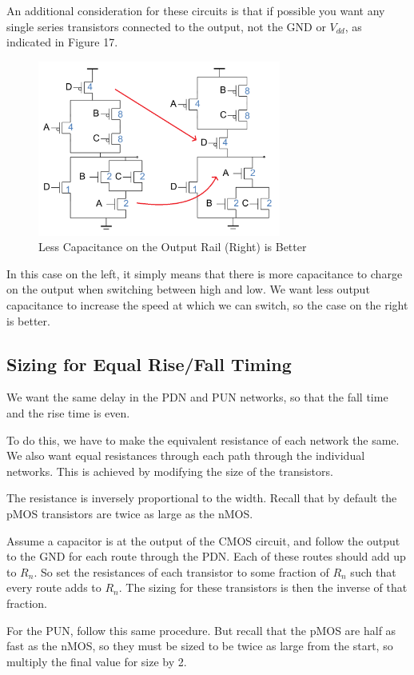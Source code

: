 \documentclass{article}
\begin{document}
An additional consideration for these circuits is that if possible you want any single series transistors connected to the output, not the GND or $V_{dd}$, as indicated in Figure 17.

\begin{figure}[ht!]
\centering
\includegraphics[width=80mm]{Capacitors.png}
\caption{Less Capacitance on the Output Rail (Right) is Better}
\end{figure}

In this case on the left, it simply means that there is more capacitance to charge on the output when switching between high and low. We want less output capacitance to increase the speed at which we can switch, so the case on the right is better. 


\subsection{Sizing for Equal Rise/Fall Timing}

We want the same delay in the PDN and PUN networks, so that the fall time and the rise time is even.

To do this, we have to make the equivalent resistance of each network the same.  We also want equal resistances through each path through the individual networks. This is achieved by modifying the size of the transistors.

The resistance is inversely proportional to the width.  Recall that by default the pMOS transistors are twice as large as the nMOS. 

Assume a capacitor is at the output of the CMOS circuit, and follow the output to the GND for each route through the PDN. Each of these routes should add up to $R_n$. So set the resistances of each transistor to some fraction of $R_n$ such that every route adds to $R_n$. The sizing for these transistors is then the inverse of that fraction. 

For the PUN, follow this same procedure. But recall that the pMOS are half as fast as the nMOS, so they must be sized to be twice as large from the start, so multiply the final value for size by 2. 
\end{document}
